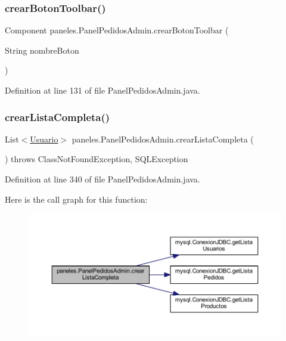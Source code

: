 \subsubsection{\texorpdfstring{crear\+Boton\+Toolbar()}{crearBotonToolbar()}}
{\footnotesize\ttfamily Component paneles.\+Panel\+Pedidos\+Admin.\+crear\+Boton\+Toolbar (\begin{DoxyParamCaption}\item[{String}]{nombre\+Boton }\end{DoxyParamCaption})}



Definition at line 131 of file Panel\+Pedidos\+Admin.\+java.

\mbox{\label{classpaneles_1_1_panel_pedidos_admin_a3f0248c018216056a00b353d5f13f097}} 
\subsubsection{\texorpdfstring{crear\+Lista\+Completa()}{crearListaCompleta()}}
{\footnotesize\ttfamily List$<$\mbox{\hyperlink{classobjetos_1_1_usuario}{Usuario}}$>$ paneles.\+Panel\+Pedidos\+Admin.\+crear\+Lista\+Completa (\begin{DoxyParamCaption}{ }\end{DoxyParamCaption}) throws Class\+Not\+Found\+Exception, S\+Q\+L\+Exception}



Definition at line 340 of file Panel\+Pedidos\+Admin.\+java.

Here is the call graph for this function\+:\nopagebreak
\begin{figure}[H]
\begin{center}
\leavevmode
\includegraphics[width=350pt]{classpaneles_1_1_panel_pedidos_admin_a3f0248c018216056a00b353d5f13f097_cgraph}
\end{center}
\end{figure}
\mbox{\label{classpaneles_1_1_panel_pedidos_admin_a700eb718ad003fd6132347117e6842c2}} 
